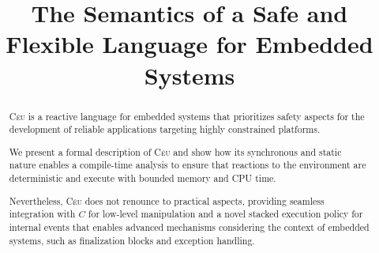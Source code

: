 \documentclass[preprint]{sigplanconf}
\newcommand{\CEU}{\textsc{C\'{e}u}\xspace}
\newcommand{\1}{\;}
\newcommand{\2}{\;\;}
\newcommand{\3}{\;\;\;}
\newcommand{\5}{\;\;\;\;\;}
\begin{document}

  \copyrightdata{[to 
be supplied]} 


\title{The Semantics of a Safe and Flexible Language for Embedded Systems}

\authorinfo{}{}{}

\maketitle

\begin{abstract}
\CEU is a reactive language for embedded systems that prioritizes safety 
aspects for the development of reliable applications targeting highly 
constrained platforms.

We present a formal description of \CEU and show how its synchronous and static 
nature enables a compile-time analysis to ensure that reactions to the 
environment are deterministic and execute with bounded memory and CPU time.

Nevertheless, \CEU does not renounce to practical aspects, providing seamless 
integration with $C$ for low-level manipulation and a novel stacked execution 
policy for internal events that enables advanced mechanisms considering the 
context of embedded systems, such as finalization blocks and exception 
handling.
\end{abstract}
\end{document}

